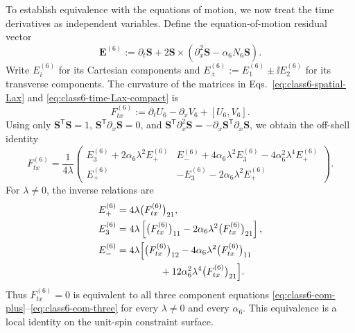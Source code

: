 To establish equivalence with the equations of motion, we now treat
the time derivatives as independent variables.  Define the
equation-of-motion residual vector
\begin{equation}
\boldsymbol E^{(6)}
:=\partial_t\boldsymbol S
+2\boldsymbol S\times
\left(\partial_x^2\boldsymbol S-\alpha_6N_6\boldsymbol S\right).
\label{eq:class6-residual-vector}
\end{equation}
Write $E^{(6)}_i$ for its Cartesian components and
$E^{(6)}_\pm:=E^{(6)}_1\pm\ii E^{(6)}_2$ for its transverse components.
The curvature of the matrices in
Eqs.~\eqref{eq:class6-spatial-Lax} and
\eqref{eq:class6-time-Lax-compact} is
\begin{equation}
F^{(6)}_{tx}:=\partial_tU_6-\partial_xV_6+[U_6,V_6].
\label{eq:class6-curvature-definition}
\end{equation}
Using only
$\boldsymbol S^{\mathsf T}\boldsymbol S=1$,
$\boldsymbol S^{\mathsf T}\partial_x\boldsymbol S=0$, and
$\boldsymbol S^{\mathsf T}\partial_x^2\boldsymbol S
=-\partial_x\boldsymbol S^{\mathsf T}\partial_x\boldsymbol S$,
we obtain the off-shell identity
\begin{equation}
F^{(6)}_{tx}
=\frac{1}{4\lambda}
\begin{pmatrix}
E^{(6)}_3+2\alpha_6\lambda^2E^{(6)}_+
&E^{(6)}_-+4\alpha_6\lambda^2E^{(6)}_3
-4\alpha_6^2\lambda^4E^{(6)}_+\\
E^{(6)}_+
&-E^{(6)}_3-2\alpha_6\lambda^2E^{(6)}_+
\end{pmatrix}.
\label{eq:class6-offshell-factorization}
\end{equation}
For $\lambda\ne0$, the inverse relations are
\begin{align}
E^{(6)}_+
&=4\lambda\bigl(F^{(6)}_{tx}\bigr)_{21},
\label{eq:class6-residual-plus-from-curvature}\\
E^{(6)}_3
&=4\lambda\left[
\bigl(F^{(6)}_{tx}\bigr)_{11}
-2\alpha_6\lambda^2\bigl(F^{(6)}_{tx}\bigr)_{21}
\right],
\label{eq:class6-residual-three-from-curvature}\\
E^{(6)}_-
&=4\lambda\Bigl[
\bigl(F^{(6)}_{tx}\bigr)_{12}
-4\alpha_6\lambda^2\bigl(F^{(6)}_{tx}\bigr)_{11}
\nonumber\\
&\hspace{4.5em}
+12\alpha_6^2\lambda^4\bigl(F^{(6)}_{tx}\bigr)_{21}
\Bigr].
\label{eq:class6-residual-minus-from-curvature}
\end{align}
Thus $F^{(6)}_{tx}=0$ is equivalent to all three component equations
\eqref{eq:class6-eom-plus}--\eqref{eq:class6-eom-three} for every
$\lambda\ne0$ and every $\alpha_6$.  This equivalence is a local
identity on the unit-spin constraint surface.
